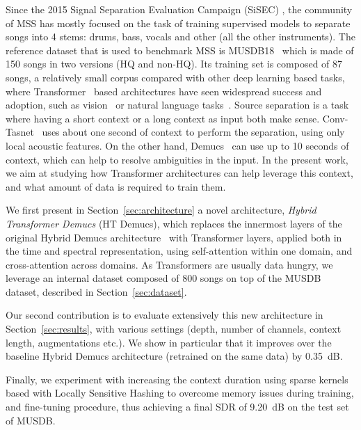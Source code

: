 \documentclass{article}
\begin{document}
Since the 2015 Signal Separation Evaluation Campaign (SiSEC) \cite{sisec15}, the community of MSS has mostly focused on the task of training supervised models to separate songs into 4 stems: drums, bass, vocals and other (all the other instruments). The reference dataset that is used to benchmark MSS is MUSDB18~\cite{musdb,musdb18-hq} which is made of 150 songs in two versions (HQ and non-HQ). 
Its training set is composed of 87 songs, a relatively small corpus compared with other deep learning based tasks, where Transformer~\cite{transformer} based architectures have seen widespread success and adoption, such as vision~\cite{layerscale,Rombach_2022_CVPR} or natural language tasks~\cite{brown2020language}. Source separation is a task where having a short context or a long context as input both make sense. Conv-Tasnet~\cite{convtasnet} uses about one second of context to perform the separation, using only local acoustic features. On the other hand, Demucs~\cite{demucsv2} can use up to 10 seconds of context, which can help to resolve ambiguities in the input. In the present work, we aim at studying how Transformer architectures can help leverage this context, and what amount of data is required to train them.

We first present in Section~\ref{sec:architecture} a novel architecture, \emph{Hybrid Transformer Demucs} (HT Demucs), which replaces the innermost layers of the original Hybrid Demucs architecture~\cite{defossez2021hybrid} with Transformer layers, applied both in the time and spectral
representation, using self-attention within one domain, and cross-attention across domains.
As Transformers are usually data hungry, we leverage an internal dataset composed of 800 songs on top of the MUSDB dataset, described in Section~\ref{sec:dataset}. 

Our second contribution is to evaluate extensively this new architecture in Section~\ref{sec:results}, with various settings (depth, number of channels, context length, augmentations etc.). We show in particular that it improves over the baseline Hybrid Demucs architecture (retrained on the same data) by 0.35~dB. 

Finally, we experiment with increasing the context duration using sparse kernels based with Locally Sensitive Hashing
to overcome memory issues during training, and fine-tuning procedure, thus achieving a final SDR of 9.20~dB on the test set of MUSDB. 
\end{document}
